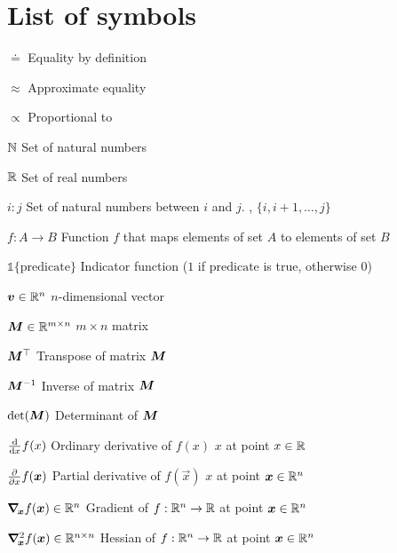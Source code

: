 \section*{List of symbols}

\vspace{10mm}

\begin{abbrv}
    \item[$\doteq$] Equality by definition
    \item[$\approx$] Approximate equality
    \item[$\propto$] Proportional to
    \item[$\N$] Set of natural numbers
    \item[$\R$] Set of real numbers
    \item[$i:j$] Set of natural numbers between $i$ and $j$. \Ie, $\{i, i+1,\ldots,j\}$
    \item[$f: A \to B$] Function $f$ that maps elements of set $A$ to elements of set $B$
    \item[$\mathbb{1}\{\mathrm{predicate}\}$] Indicator function ($1$ if $\mathrm{predicate}$ is true, otherwise $0$)

    \item

    \item[$\vec{v} \in \R^n$] $n$-dimensional vector
    \item[$\mat{M} \in \R^{m\times n}$] $m \times n$ matrix
    \item[$\transpose{\mat{M}}$] Transpose of matrix $\mat{M}$
    \item[$\inv{\mat{M}}$] Inverse of matrix $\mat{M}$
    \item[$\det{\mat{M}}$] Determinant of $\mat{M}$

    \item

    \item[$\odv*{f(x)}{x}$] Ordinary derivative of $f(x)$ \wrt $x$ at point $x\in\R$
    \item[$\pdv*{f(\vec{x})}{x}$] Partial derivative of $f(\vec{x})$ \wrt $x$ at point $\vec{x}\in\R^n$
    \item[$\grad{f(\vec{x})}{\vec{x}} \in \R^n$] Gradient of $f: \R^n \to \R$ at point $\vec{x}\in\R^n$
    \item[$\hess{f(\vec{x})}{\vec{x}} \in \R^{n\times n}$] Hessian of $f: \R^n \to \R$ at point $\vec{x}\in\R^n$
\end{abbrv}
